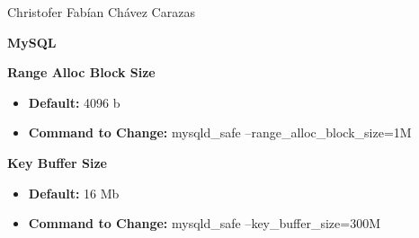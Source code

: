 \documentclass[a4paper,12pt]{article}
\begin{document}
Christofer Fabían Chávez Carazas

  \begin{center}
   \textbf{MySQL}
  \end{center}


  \textbf{Range Alloc Block Size}
   \begin{itemize}
    \item \textbf{Default: } 4096 b 
    \item \textbf{Command to Change: } mysqld\_safe --range\_alloc\_block\_size=1M  
   \end{itemize}
  
  
  \textbf{Key Buffer Size}
  
   \begin{itemize}
    \item \textbf{Default: }  16 Mb
    \item \textbf{Command to Change: } mysqld\_safe --key\_buffer\_size=300M 
   \end{itemize}

  
\end{document}
